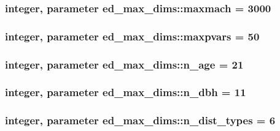 \subsubsection[{\texorpdfstring{maxmach}{maxmach}}]{\setlength{\rightskip}{0pt plus 5cm}integer, parameter ed\+\_\+max\+\_\+dims\+::maxmach = 3000}\hypertarget{namespaceed__max__dims_a499b4b6352c44f2e900d47d4a1c96bb9}{}\label{namespaceed__max__dims_a499b4b6352c44f2e900d47d4a1c96bb9}
\subsubsection[{\texorpdfstring{maxpvars}{maxpvars}}]{\setlength{\rightskip}{0pt plus 5cm}integer, parameter ed\+\_\+max\+\_\+dims\+::maxpvars = 50}\hypertarget{namespaceed__max__dims_a8a123eff9f71a8d57c2b6d7cec1d3c5b}{}\label{namespaceed__max__dims_a8a123eff9f71a8d57c2b6d7cec1d3c5b}
\subsubsection[{\texorpdfstring{n\+\_\+age}{n_age}}]{\setlength{\rightskip}{0pt plus 5cm}integer, parameter ed\+\_\+max\+\_\+dims\+::n\+\_\+age = 21}\hypertarget{namespaceed__max__dims_a84ccb51c1637971b5b4b87c83b2b24ae}{}\label{namespaceed__max__dims_a84ccb51c1637971b5b4b87c83b2b24ae}
\subsubsection[{\texorpdfstring{n\+\_\+dbh}{n_dbh}}]{\setlength{\rightskip}{0pt plus 5cm}integer, parameter ed\+\_\+max\+\_\+dims\+::n\+\_\+dbh = 11}\hypertarget{namespaceed__max__dims_a380455bae103b42e1281c4398372a696}{}\label{namespaceed__max__dims_a380455bae103b42e1281c4398372a696}
\subsubsection[{\texorpdfstring{n\+\_\+dist\+\_\+types}{n_dist_types}}]{\setlength{\rightskip}{0pt plus 5cm}integer, parameter ed\+\_\+max\+\_\+dims\+::n\+\_\+dist\+\_\+types = 6}\hypertarget{namespaceed__max__dims_a7a8205408259fcb297b0cb04f549fe44}{}\label{namespaceed__max__dims_a7a8205408259fcb297b0cb04f549fe44}
